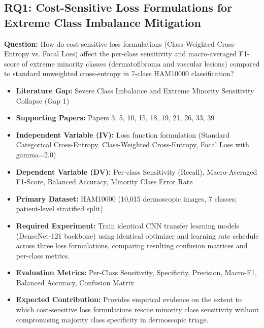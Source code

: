 \documentclass[11pt,a4paper]{article}
\begin{document}
\subsection{RQ1: Cost-Sensitive Loss Formulations for Extreme Class Imbalance Mitigation}
\textbf{Question:} How do cost-sensitive loss formulations (Class-Weighted Cross-Entropy vs. Focal Loss) affect the per-class sensitivity and macro-averaged F1-score of extreme minority classes (dermatofibroma and vascular lesions) compared to standard unweighted cross-entropy in 7-class HAM10000 classification?
\begin{itemize}
\item \textbf{Literature Gap:} Severe Class Imbalance and Extreme Minority Sensitivity Collapse (Gap 1)
\item \textbf{Supporting Papers:} Papers 3, 5, 10, 15, 18, 19, 21, 26, 33, 39
\item \textbf{Independent Variable (IV):} Loss function formulation (Standard Categorical Cross-Entropy, Class-Weighted Cross-Entropy, Focal Loss with gamma=2.0)
\item \textbf{Dependent Variable (DV):} Per-class Sensitivity (Recall), Macro-Averaged F1-Score, Balanced Accuracy, Minority Class Error Rate
\item \textbf{Primary Dataset:} HAM10000 (10,015 dermoscopic images, 7 classes; patient-level stratified split)
\item \textbf{Required Experiment:} Train identical CNN transfer learning models (DenseNet-121 backbone) using identical optimizer and learning rate schedule across three loss formulations, comparing resulting confusion matrices and per-class metrics.
\item \textbf{Evaluation Metrics:} Per-Class Sensitivity, Specificity, Precision, Macro-F1, Balanced Accuracy, Confusion Matrix
\item \textbf{Expected Contribution:} Provides empirical evidence on the extent to which cost-sensitive loss formulations rescue minority class sensitivity without compromising majority class specificity in dermoscopic triage.
\end{itemize}
\end{document}
